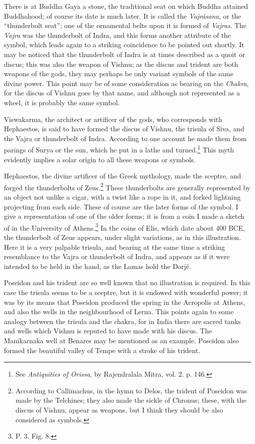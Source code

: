 \documentclass[a4paper, 11pt, oneside, english, landscape, twocolumn]{article}
\begin{document}
There is at Buddha Gaya a stone, the traditional seat on which Buddha attained Buddhahood; of course its date is much later. It is called the \emph{Vajrásana}, or the ``thunderbolt seat''; one of the ornamental belts upon it is formed of \emph{Vajras}. The \emph{Vajra} was the thunderbolt of Indra, and this forms another attribute of the symbol, which leads again to a striking coincidence to be pointed out shortly. It may be noticed that the thunderbolt of Indra is at times described as a quoit or discus; this was also the weapon of Vishnu; as the discus and trident are both weapons of the gods, they may perhaps be only variant symbols of the same divine power. This point may be of some consideration as bearing on the \emph{Chakra}, for the discus of Vishnu goes by that name, and although not represented as a wheel, it is probably the same symbol.

Viswakarma, the architect or artificer of the gods, who corresponds with Hephaestos, is said to have formed the discus of Vishnu, the trisula of Siva, and the Vajra or thunderbolt of Indra. According to one account he made them from parings of Surya or the sun, which he put in a lathe and turned.\footnote{See \emph{Antiquities of Orissa}, by Rajendralala Mitra, vol. 2. p. 146.} This myth evidently implies a solar origin to all these weapons or symbols.

Hephaestos, the divine artificer of the Greek mythology, made the sceptre, and forged the thunderbolts of Zeus.\footnote{According to Callimachus, in the hymn to Delos, the trident of Poseidon was made by the Telchines; they also made the sickle of Chronus; these, with the discus of Vishnu, appear as weapons, but I think they should be also considered as symbols.} These thunderbolts are generally represented by an object not unlike a cigar, with a twist like a rope in it, and forked lightning projecting from each side. These of course are the later forms of the symbol. I give a representation of one of the older forms; it is from a coin I made a sketch of in the University of Athens.\footnote{P. 3. Fig. 8.} In the coins of Elis, which date about 400 BCE, the thunderbolt of Zeus appears, under slight variations, as in this illustration. Here it is a very palpable trisula, and bearing at the same time a striking resemblance to the Vajra or thunderbolt of Indra, and appears as if it were intended to be held in the hand, as the Lamas hold the Dorjé.

Poseidon and his trident are so well known that no illustration is required. In this case the trisula seems to be a sceptre, but it is endowed with wonderful power; it was by its means that Poseidon produced the spring in the Acropolis at Athens, and also the wells in the neighbourhood of Lerna. This points again to some analogy between the trisula and the chakra, for in India there are sacred tanks and wells which Vishnu is reputed to have made with his discus. The Manikarnaka well at Benares may be mentioned as an example. Poseidon also formed the beautiful valley of Tempe with a stroke of his trident.
\end{document}
